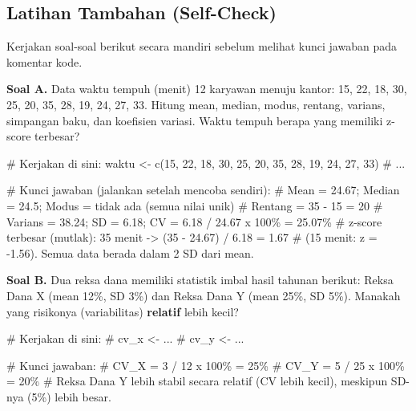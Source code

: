 \documentclass[
  indonesian,
  letterpaper,
]{book}
\newenvironment{Shaded}{\begin{snugshade}}{\end{snugshade}}
\newcommand{\CommentTok}[1]{\textcolor[rgb]{0.37,0.37,0.37}{#1}}
\newcommand{\DecValTok}[1]{\textcolor[rgb]{0.68,0.00,0.00}{#1}}
\newcommand{\FunctionTok}[1]{\textcolor[rgb]{0.28,0.35,0.67}{#1}}
\newcommand{\NormalTok}[1]{\textcolor[rgb]{0.00,0.23,0.31}{#1}}
\newcommand{\OtherTok}[1]{\textcolor[rgb]{0.00,0.23,0.31}{#1}}
\begin{document}
\subsection{Latihan Tambahan
(Self-Check)}\label{latihan-tambahan-self-check-4}

Kerjakan soal-soal berikut secara mandiri sebelum melihat kunci jawaban
pada komentar kode.

\textbf{Soal A.} Data waktu tempuh (menit) 12 karyawan menuju kantor:
15, 22, 18, 30, 25, 20, 35, 28, 19, 24, 27, 33. Hitung mean, median,
modus, rentang, varians, simpangan baku, dan koefisien variasi. Waktu
tempuh berapa yang memiliki z-score terbesar?

\begin{Shaded}
\begin{Highlighting}[]
\CommentTok{\# Kerjakan di sini:}
\NormalTok{waktu }\OtherTok{\textless{}{-}} \FunctionTok{c}\NormalTok{(}\DecValTok{15}\NormalTok{, }\DecValTok{22}\NormalTok{, }\DecValTok{18}\NormalTok{, }\DecValTok{30}\NormalTok{, }\DecValTok{25}\NormalTok{, }\DecValTok{20}\NormalTok{, }\DecValTok{35}\NormalTok{, }\DecValTok{28}\NormalTok{, }\DecValTok{19}\NormalTok{, }\DecValTok{24}\NormalTok{, }\DecValTok{27}\NormalTok{, }\DecValTok{33}\NormalTok{)}
\CommentTok{\# ...}

\CommentTok{\# Kunci jawaban (jalankan setelah mencoba sendiri):}
\CommentTok{\# Mean = 24.67; Median = 24.5; Modus = tidak ada (semua nilai unik)}
\CommentTok{\# Rentang = 35 {-} 15 = 20}
\CommentTok{\# Varians = 38.24; SD = 6.18; CV = 6.18 / 24.67 x 100\% = 25.07\%}
\CommentTok{\# z{-}score terbesar (mutlak): 35 menit {-}\textgreater{} (35 {-} 24.67) / 6.18 = 1.67}
\CommentTok{\# (15 menit: z = {-}1.56). Semua data berada dalam 2 SD dari mean.}
\end{Highlighting}
\end{Shaded}

\textbf{Soal B.} Dua reksa dana memiliki statistik imbal hasil tahunan
berikut: Reksa Dana X (mean 12\%, SD 3\%) dan Reksa Dana Y (mean 25\%,
SD 5\%). Manakah yang risikonya (variabilitas) \textbf{relatif} lebih
kecil?

\begin{Shaded}
\begin{Highlighting}[]
\CommentTok{\# Kerjakan di sini:}
\CommentTok{\# cv\_x \textless{}{-} ...}
\CommentTok{\# cv\_y \textless{}{-} ...}

\CommentTok{\# Kunci jawaban:}
\CommentTok{\# CV\_X = 3 / 12 x 100\% = 25\%}
\CommentTok{\# CV\_Y = 5 / 25 x 100\% = 20\%}
\CommentTok{\# Reksa Dana Y lebih stabil secara relatif (CV lebih kecil), meskipun SD{-}nya (5\%) lebih besar.}
\end{Highlighting}
\end{Shaded}
\end{document}

